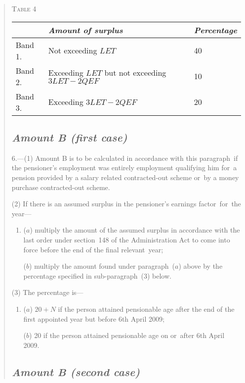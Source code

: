 \documentclass[12pt,a4paper]{article}
\begin{document}
\begin{quotation}
\medskip

\noindent\textsc{Table 4}

{\noindent\footnotesize
\begin{longtable}{lll}
\hline
&\itshape Amount of surplus	&\itshape Percentage\\
\hline
\endhead
\hline
\endlastfoot
Band 1. 	&Not exceeding $LET$	&40\\
Band 2. 	&Exceeding $LET$ but not exceeding $3LET - 2QEF$	&10\\
Band 3. 	&Exceeding $3LET - 2QEF$	&20\\
\end{longtable}

}

\subsection*{\itshape Amount B (first case)}

6.---(1) Amount B is to be calculated in accordance with this paragraph~if the pensioner’s employment was entirely employment qualifying him for~a pension provided by a salary related contracted-out scheme or~by a money purchase contracted-out scheme.

(2) If there is an assumed surplus in the pensioner’s earnings factor~for~the year—
\begin{enumerate}\item[]
($a$) multiply the amount of the assumed surplus in accordance with the last order under section~148 of the Administration Act to come into force before the end of the final relevant~year;

($b$) multiply the amount found under paragraph~($a$)  above by the percentage specified in sub-paragraph~(3)  below.
\end{enumerate}

(3) The percentage is—
\begin{enumerate}\item[]
($a$) $20 + N$ if the person attained pensionable age after the end of the first appointed year but before 6th April 2009;

($b$) 20 if the person attained pensionable age on or~after 6th April 2009. 
\end{enumerate}

\subsection*{\itshape Amount B (second case)}


\end{quotation}
\end{document}
